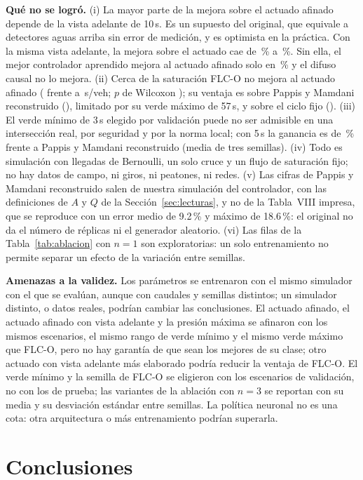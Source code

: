 \documentclass[journal]{IEEEtran}
\newcommand{\FLC}{FLC-O}
\newcommand{\PMR}{Pappis y Mamdani reconstruido}
\begin{document}
\textbf{Qué no se logró.} (i) La mayor parte de la mejora sobre el actuado afinado depende de la vista adelante de 10\,s. Es un supuesto del original, que equivale a detectores aguas arriba sin error de medición, y es optimista en la práctica. Con la misma vista adelante, la mejora sobre el actuado cae de \RedActAfOf\,\% a \RedActVOf\,\%. Sin ella, el mejor controlador aprendido mejora al actuado afinado solo en \RedActMlpC\,\% y el difuso causal no lo mejora. (ii) Cerca de la saturación \FLC{} no mejora al actuado afinado (\DelaySaFlc{} frente a \DelaySaActAf{}\,s/veh; $p$ de Wilcoxon \EscActAfSaP{}); su ventaja es sobre \PMR{} (\DelaySaPap{}), limitado por su verde máximo de 57\,s, y sobre el ciclo fijo (\DelaySaFijo{}). (iii) El verde mínimo de 3\,s elegido por validación puede no ser admisible en una intersección real, por seguridad y por la norma local; con 5\,s la ganancia es de \RedPapMedGCinco\,\% frente a \PMR{} (media de tres semillas). (iv) Todo es simulación con llegadas de Bernoulli, un solo cruce y un flujo de saturación fijo; no hay datos de campo, ni giros, ni peatones, ni redes. (v) Las cifras de \PMR{} salen de nuestra simulación del controlador, con las definiciones de $A$ y $Q$ de la Sección~\ref{sec:lecturas}, y no de la Tabla~VIII impresa, que se reproduce con un error medio de 9.2\,\% y máximo de 18.6\,\%: el original no da el número de réplicas ni el generador aleatorio. (vi) Las filas de la Tabla~\ref{tab:ablacion} con $n=1$ son exploratorias: un solo entrenamiento no permite separar un efecto de la variación entre semillas.

\textbf{Amenazas a la validez.} Los parámetros se entrenaron con el mismo simulador con el que se evalúan, aunque con caudales y semillas distintos; un simulador distinto, o datos reales, podrían cambiar las conclusiones. El actuado afinado, el actuado afinado con vista adelante y la presión máxima se afinaron con los mismos escenarios, el mismo rango de verde mínimo y el mismo verde máximo que \FLC{}, pero no hay garantía de que sean los mejores de su clase; otro actuado con vista adelante más elaborado podría reducir la ventaja de \FLC{}. El verde mínimo y la semilla de \FLC{} se eligieron con los escenarios de validación, no con los de prueba; las variantes de la ablación con $n=3$ se reportan con su media y su desviación estándar entre semillas. La política neuronal no es una cota: otra arquitectura o más entrenamiento podrían superarla.

\section{Conclusiones}
\label{sec:conclusiones}
\end{document}
